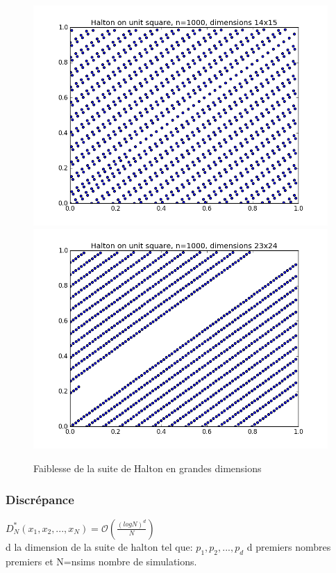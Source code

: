 \documentclass[12pt]{report}
\begin{document}
\begin{figure}[!h]
\centering
\includegraphics[scale=0.5]{figure_2-halton-dimensions 14 15.png}
\includegraphics[scale=0.5]{figure_2-halton-dimensions 23 24.png}	
\caption{Faiblesse de la suite de Halton en grandes dimensions}
\end{figure}

\subsubsection{Discrépance}
$D_N^*(x_1,x_2,...,x_N)=\mathcal{O}(\frac{(logN)^d}{N}) $\\
d la dimension de la suite de halton tel que: $p_1,p_2,...,p_d$ d premiers nombres premiers et N=nsims nombre de simulations.
\newpage
\end{document}
